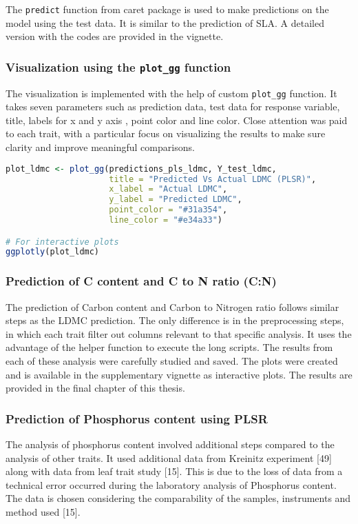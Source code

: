 \documentclass[12pt,a4paper]{report}
\begin{document}
The \texttt{predict} function from caret package is used to make predictions on the model using the test data. It is similar to the prediction of SLA. A detailed version with the codes are provided in the vignette. \\


\subsubsection*{Visualization using the \texttt{plot\_gg} function}
The visualization is implemented with the help of custom \texttt{plot\_gg} function. It takes seven parameters such as prediction data, test data for response variable, title, labels for x and y axis , point color and line color. Close attention was paid to each trait, with a particular focus on visualizing the results to make sure clarity and improve meaningful comparisons. \\

\begin{lstlisting}[language=R, style=mystyle]
plot_ldmc <- plot_gg(predictions_pls_ldmc, Y_test_ldmc,
                     title = "Predicted Vs Actual LDMC (PLSR)",
                     x_label = "Actual LDMC",
                     y_label = "Predicted LDMC",
                     point_color = "#31a354",
                     line_color = "#e34a33")

# For interactive plots
ggplotly(plot_ldmc)
\end{lstlisting}

\subsubsection*{Prediction of C content and C to N ratio (C:N)}
The prediction of Carbon content and Carbon to Nitrogen ratio follows similar steps as the LDMC prediction. The only difference is in the preprocessing steps, in which each trait filter out columns relevant to that specific analysis. It uses the advantage of the helper function to execute the long scripts. The results from each of these analysis were carefully studied and saved. The plots were created and is available in the supplementary vignette as interactive plots. The results are provided in the final chapter of this thesis.

\subsubsection*{Prediction of Phosphorus content using PLSR}
The analysis of phosphorus content involved additional steps compared to the analysis of other traits. It used additional data from Kreinitz experiment [49] along with data from leaf trait study [15]. This is due to the loss of data from a technical error occurred during the laboratory analysis of Phosphorus content. The data is chosen considering the comparability of the samples, instruments and method used [15]. \\
\end{document}
